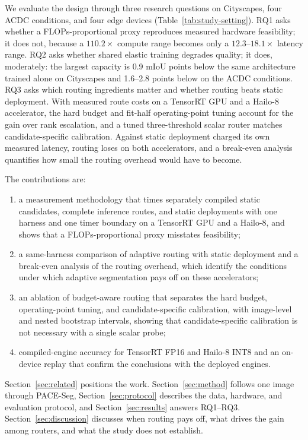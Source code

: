 \documentclass[a4paper,5p]{elsarticle}
\newcommand{\method}{PACE-Seg}
\newcommand{\miou}{mIoU}
\begin{document}
We evaluate the design through three research questions on Cityscapes, four ACDC conditions, and four edge devices (Table~\ref{tab:study-setting}). RQ1 asks whether a FLOPs-proportional proxy reproduces measured hardware feasibility; it does not, because a $110.2\times$ compute range becomes only a $12.3$--$18.1\times$ latency range. RQ2 asks whether shared elastic training degrades quality; it does, moderately: the largest capacity is 0.9 \miou{} points below the same architecture trained alone on Cityscapes and 1.6--2.8 points below on the ACDC conditions. RQ3 asks which routing ingredients matter and whether routing beats static deployment. With measured route costs on a TensorRT GPU and a Hailo-8 accelerator, the hard budget and fit-half operating-point tuning account for the gain over rank escalation, and a tuned three-threshold scalar router matches candidate-specific calibration. Against static deployment charged its own measured latency, routing loses on both accelerators, and a break-even analysis quantifies how small the routing overhead would have to become.

The contributions are:
\begin{enumerate}
    \item a measurement methodology that times separately compiled static candidates, complete inference routes, and static deployments with one harness and one timer boundary on a TensorRT GPU and a Hailo-8, and shows that a FLOPs-proportional proxy misstates feasibility;
    \item a same-harness comparison of adaptive routing with static deployment and a break-even analysis of the routing overhead, which identify the conditions under which adaptive segmentation pays off on these accelerators;
    \item an ablation of budget-aware routing that separates the hard budget, operating-point tuning, and candidate-specific calibration, with image-level and nested bootstrap intervals, showing that candidate-specific calibration is not necessary with a single scalar probe;
    \item compiled-engine accuracy for TensorRT FP16 and Hailo-8 INT8 and an on-device replay that confirm the conclusions with the deployed engines.
\end{enumerate}

Section~\ref{sec:related} positions the work. Section~\ref{sec:method} follows one image through \method{}, Section~\ref{sec:protocol} describes the data, hardware, and evaluation protocol, and Section~\ref{sec:results} answers RQ1--RQ3. Section~\ref{sec:discussion} discusses when routing pays off, what drives the gain among routers, and what the study does not establish.
\end{document}
